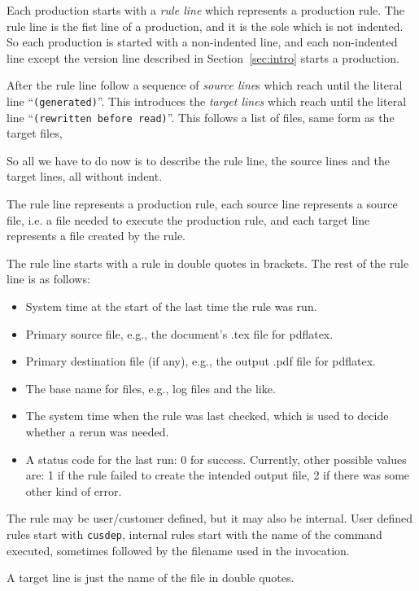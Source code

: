 \documentclass[a4paper, english]{article}%
\begin{document}
Each production starts with a \emph{rule line} which represents a production rule. 
The rule line is the fist line of a production, and it is the sole which is not indented.  
So each production is started with a non-indented line, 
and each non-indented line except the version line described in Section~\ref{sec:intro} starts a production. 

After the rule line follow a sequence of \emph{source line}s 
which reach until the literal line ``\texttt{(generated)}''. 
This introduces the \emph{target lines} 
which reach until the literal line ``\texttt{(rewritten before read)}''. 
This follows a list of files, same form as the target files, 

So all we have to do now is to describe the rule line, 
the source lines and the target lines, all without indent. 

The rule line represents a production rule, 
each source line represents a source file, 
i.e. a file needed to execute the production rule, 
and each target line represents a file created by the rule. 

The rule line starts with a rule in double quotes in brackets. 
The rest of the rule line is as follows: 
%
\begin{itemize}
  \item 
  System time at the start of the last time the rule was run.
  \item 
  Primary source file, e.g., the document's .tex file for pdflatex.
  \item 
  Primary destination file (if any), e.g., the output .pdf file for pdflatex.
  \item 
  The base name for files, e.g., log files and the like.
  \item 
  The system time when the rule was last checked, 
  which is used to decide whether a rerun was needed.
  \item
  A status code for the last run: 0 for success. Currently, other possible values are: 1 if the rule failed to create the intended output file, 2 if there was some other kind of error.

\end{itemize}

The rule may be user/customer defined, but it may also be internal. 
User defined rules start with \texttt{cusdep}, 
internal rules start with the name of the command executed, 
sometimes followed by the filename used in the invocation. 

A target line is just the name of the file in double quotes. 
\end{document}
